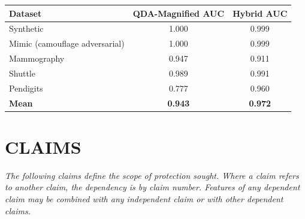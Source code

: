 \documentclass[12pt,a4paper]{article}
\begin{document}
\begin{center}
\begin{tabular}{lcc}
\toprule
\textbf{Dataset} & \textbf{QDA-Magnified AUC} & \textbf{Hybrid AUC} \\
\midrule
Synthetic & 1.000 & 0.999 \\
Mimic (camouflage adversarial) & 1.000 & 0.999 \\
Mammography & 0.947 & 0.911 \\
Shuttle & 0.989 & 0.991 \\
Pendigits & 0.777 & 0.960 \\
\midrule
\textbf{Mean} & \textbf{0.943} & \textbf{0.972} \\
\bottomrule
\end{tabular}
\end{center}

\section{CLAIMS}

\noindent\textit{The following claims define the scope of protection
sought. Where a claim refers to another claim, the dependency is by claim
number. Features of any dependent claim may be combined with any
independent claim or with other dependent claims.}
\vspace{0.8em}
\end{document}
